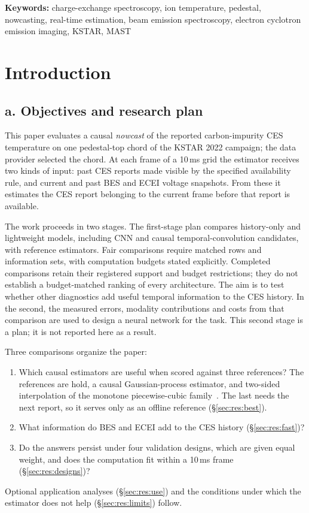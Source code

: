\documentclass[11pt,a4paper]{article}
\begin{document}
\begin{abstract}
\end{abstract}

\noindent\textbf{Keywords:} charge-exchange spectroscopy, ion temperature, pedestal, nowcasting, real-time estimation, beam emission spectroscopy, electron cyclotron emission imaging, KSTAR, MAST

\section{Introduction}
\label{sec:intro}

\subsection*{a. Objectives and research plan}
This paper evaluates a causal \emph{nowcast} of the reported carbon-impurity CES temperature on one pedestal-top chord of the KSTAR 2022 campaign; the data provider selected the chord. At each frame of a 10\,ms grid the estimator receives two kinds of input: past CES reports made visible by the specified availability rule, and current and past BES and ECEI voltage snapshots. From these it estimates the CES report belonging to the current frame before that report is available.

The work proceeds in two stages. The first-stage plan compares history-only and lightweight models, including CNN and causal temporal-convolution candidates, with reference estimators. Fair comparisons require matched rows and information sets, with computation budgets stated explicitly. Completed comparisons retain their registered support and budget restrictions; they do not establish a budget-matched ranking of every architecture. The aim is to test whether other diagnostics add useful temporal information to the CES history. In the second, the measured errors, modality contributions and costs from that comparison are used to design a neural network for the task. This second stage is a plan; it is not reported here as a result.

Three comparisons organize the paper:
\begin{enumerate}\setlength{\itemsep}{1pt}\setlength{\parskip}{0pt}
\item Which causal estimators are useful when scored against three references? The references are hold, a causal Gaussian-process estimator, and two-sided interpolation of the monotone piecewise-cubic family~\citep{fritsch1980}. The last needs the next report, so it serves only as an offline reference (\S\ref{sec:res:best}).
\item What information do BES and ECEI add to the CES history (\S\ref{sec:res:fast})?
\item Do the answers persist under four validation designs, which are given equal weight, and does the computation fit within a 10\,ms frame (\S\ref{sec:res:designs})?
\end{enumerate}
Optional application analyses (\S\ref{sec:res:use}) and the conditions under which the estimator does not help (\S\ref{sec:res:limits}) follow.
\end{document}
